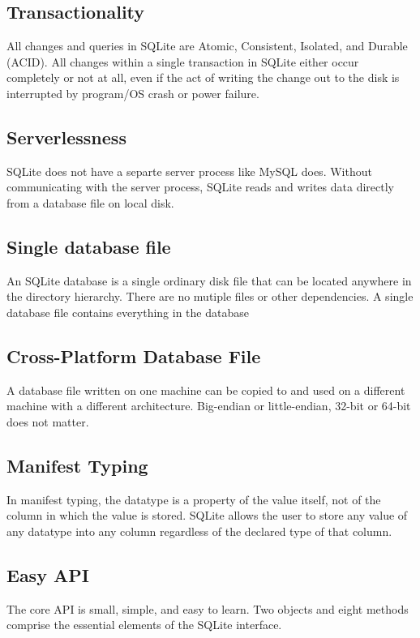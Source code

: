 \documentclass[journal]{IEEEtran}
\begin{document}
\subsection{Transactionality}
All changes and queries in SQLite are Atomic, Consistent, Isolated, and Durable (ACID). All changes within a single transaction in SQLite either occur completely or not at all, even if the act of writing the change out to the disk is interrupted by program/OS crash or power failure.

\subsection{Serverlessness}
SQLite does not have a separte server process like MySQL does. Without communicating with the server process, SQLite reads and writes data directly from a database file on local disk.

\subsection{Single database file}
An SQLite database is a single ordinary disk file that can be located anywhere in the directory hierarchy. There are no mutiple files or other dependencies. A single database file contains everything in the database

\subsection{Cross-Platform Database File}
A database file written on one machine can be copied to and used on a different machine with a different architecture. Big-endian or little-endian, 32-bit or 64-bit does not matter.

\subsection{Manifest Typing}
In manifest typing, the datatype is a property of the value itself, not of the column in which the value is stored. SQLite allows the user to store any value of any datatype into any column regardless of the declared type of that column.

\subsection{Easy API}
The core API is small, simple, and easy to learn. Two objects and eight methods comprise the essential elements of the SQLite interface.
\end{document}
